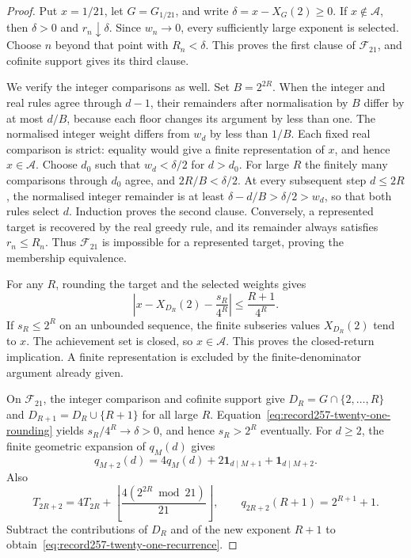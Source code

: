 \documentclass[11pt]{article}
\theoremstyle{plain}
\theoremstyle{definition}
\theoremstyle{remark}
\begin{document}
\begin{proof}
Put $x=1/21$, let $G=G_{1/21}$, and write $\delta=x-X_G(2)\ge0$.
If $x\notin\mathcal A$, then $\delta>0$ and $r_n\downarrow\delta$.
Since $w_n\to0$, every sufficiently large exponent is selected. Choose
$n$ beyond that point with $R_n<\delta$. This proves the first clause of
$\mathcal F_{21}$, and cofinite support gives its third clause.

We verify the integer comparisons as well. Set $B=2^{2R}$. When the
integer and real rules agree through $d-1$, their remainders after
normalisation by $B$ differ by at most $d/B$, because each floor changes
its argument by less than one. The normalised integer weight differs
from $w_d$ by less than $1/B$. Each fixed real comparison is strict:
equality would give a finite representation of $x$, and hence
$x\in\mathcal A$. Choose $d_0$ such that $w_d<\delta/2$ for $d>d_0$.
For large $R$ the finitely many comparisons through $d_0$ agree, and
$2R/B<\delta/2$. At every subsequent step $d\le2R$, the normalised
integer remainder is at least $\delta-d/B>\delta/2>w_d$, so that both
rules select $d$. Induction proves the second clause. Conversely, a
represented target is recovered by the real greedy rule, and its
remainder always satisfies $r_n\le R_n$. Thus $\mathcal F_{21}$ is
impossible for a represented target, proving the membership equivalence.

For any $R$, rounding the target and the selected weights gives
\begin{equation}
 \left|x-X_{D_R}(2)-\frac{s_R}{4^R}\right|
 \le\frac{R+1}{4^R}.
 \label{eq:record257-twenty-one-rounding}
\end{equation}
If $s_R\le2^R$ on an unbounded sequence, the finite subseries values
$X_{D_R}(2)$ tend to $x$. The achievement set is closed, so $x\in\mathcal A$.
This proves the closed-return implication. A finite representation is
excluded by the finite-denominator argument already given.

On $\mathcal F_{21}$, the integer comparison and cofinite support give
$D_R=G\cap\{2,\ldots,R\}$ and $D_{R+1}=D_R\cup\{R+1\}$ for all large
$R$. Equation~\eqref{eq:record257-twenty-one-rounding} yields
$s_R/4^R\to\delta>0$, and hence $s_R>2^R$ eventually. For $d\ge2$,
the finite geometric expansion of $q_M(d)$ gives
\[
 q_{M+2}(d)=4q_M(d)+2\mathbf1_{d\mid M+1}+\mathbf1_{d\mid M+2}.
\]
Also
\[
 T_{2R+2}=4T_{2R}+
 \left\lfloor\frac{4(2^{2R}\bmod21)}{21}\right\rfloor,
 \qquad q_{2R+2}(R+1)=2^{R+1}+1.
\]
Subtract the contributions of $D_R$ and of the new exponent $R+1$ to
obtain~\eqref{eq:record257-twenty-one-recurrence}.
\end{proof}
\end{document}
